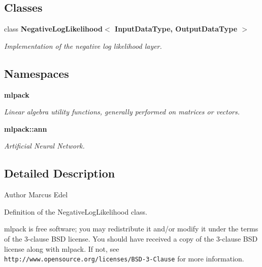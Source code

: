 \subsection*{Classes}
\begin{DoxyCompactItemize}
\item 
class \textbf{ Negative\+Log\+Likelihood$<$ Input\+Data\+Type, Output\+Data\+Type $>$}
\begin{DoxyCompactList}\small\item\em Implementation of the negative log likelihood layer. \end{DoxyCompactList}\end{DoxyCompactItemize}
\subsection*{Namespaces}
\begin{DoxyCompactItemize}
\item 
 \textbf{ mlpack}
\begin{DoxyCompactList}\small\item\em Linear algebra utility functions, generally performed on matrices or vectors. \end{DoxyCompactList}\item 
 \textbf{ mlpack\+::ann}
\begin{DoxyCompactList}\small\item\em Artificial Neural Network. \end{DoxyCompactList}\end{DoxyCompactItemize}


\subsection{Detailed Description}
\begin{DoxyAuthor}{Author}
Marcus Edel
\end{DoxyAuthor}
Definition of the Negative\+Log\+Likelihood class.

mlpack is free software; you may redistribute it and/or modify it under the terms of the 3-\/clause B\+SD license. You should have received a copy of the 3-\/clause B\+SD license along with mlpack. If not, see {\tt http\+://www.\+opensource.\+org/licenses/\+B\+S\+D-\/3-\/\+Clause} for more information. 